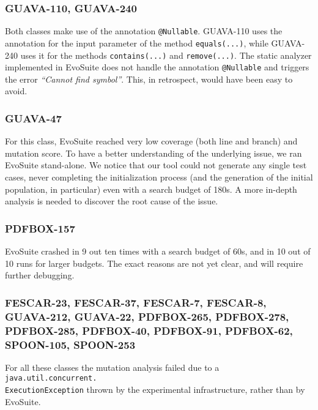 \documentclass[sigconf]{acmart}
\newcommand{\EVOSUITE}{{\sc EvoSuite}\xspace}
\begin{document}


\subsubsection*{GUAVA-110, GUAVA-240} Both classes make use of the annotation \texttt{@Nullable}. GUAVA-110 uses the annotation for the input parameter of the method \texttt{equals(...)}, while GUAVA-240 uses it for the methods \texttt{contains(...)} and \texttt{remove(...)}. The static analyzer implemented in \EVOSUITE does not handle the annotation \texttt{@Nullable} and triggers the error \textit{``Cannot find symbol''}. This, in retrospect, would have been easy to avoid.

\subsubsection*{GUAVA-47} For this class, \EVOSUITE reached very low coverage (both line and branch) and mutation score. To have a better understanding of the underlying issue, we ran \EVOSUITE stand-alone. We notice that our tool could not generate any single test cases, never completing the initialization process (and the generation of the initial population, in particular) even with a search budget of 180s. A more in-depth analysis is needed to discover the root cause of the issue.  

\subsubsection*{PDFBOX-157} \EVOSUITE crashed in 9 out ten times with a search budget of 60s, and in 10 out of 10 runs for larger budgets. The exact reasons are not yet clear, and will require further debugging.


\subsubsection*{FESCAR-23, FESCAR-37, FESCAR-7, FESCAR-8, GUAVA-212, GUAVA-22,
PDFBOX-265, PDFBOX-278, PDFBOX-285, PDFBOX-40, PDFBOX-91, PDFBOX-62, SPOON-105,
SPOON-253} For all these classes the mutation analysis failed due to a
\texttt{java.util.concurrent.\\ExecutionException} thrown by the experimental
infrastructure, rather than by \EVOSUITE.
\end{document}
